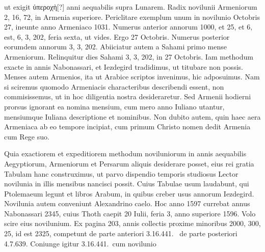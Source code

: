 ut exigit \textgreek{ὐπεροχὴ}[?] anni aequabilis supra Lunarem.
Radix novilunii Armeniorum
2, 16, 72, in Armenia superiore.
Periclitare exemplum %
 unum
in novilunio Octobris 27, ineunte anno Armeniaco 1031.
Numerus
anterior annorum 1000, et 25, et 6, est, 6, 3, 202, feria sexta, ut vides.
Ergo 27 Octobris.
Numerus posterior eorumdem annorum 3, 3, 202.
Abiiciatur autem a Sahami primo mense Armeniorum.
Relinquitur
dies Sahami 3, 3, 202, in 27 Octobris.
Iam methodum exacte
in annis Nabonassari, et
Iezdegird tradidimus, ut
titubare non possis.
Menses
autem Armenios, ita
ut Arabice scriptos invenimus, hic adposuimus.
Nam si sciremus
quomodo Armeniacis
characteribus describendi
essent, non commisissemus,
ut in hoc diligentia
nostra desideraretur.
Sed Armenii hodierni
prorsus ignorant ea nomina
mensium, cum mero %
anno Iuliano utantur,
mensiumque Iuliana descriptione
et nominibus.
Non dubito autem, quin
haec aera Armeniaca ab
eo tempore incipiat, cum
primum Christo nomen
dedit Armenia cum Rege suo.
%
%
\begin{table}[tbp]
  
\end{table}
\begin{table}[tbp]
  
\end{table}
%
Quia exactiorem et expeditiorem methodum noviluniorum in
annis aequabilis Aegyptiorum, Armeniorum et Persarum aliquis
desiderare posset, eius rei gratia Tabulam
hanc construximus, ut parvo
dispendio temporis studiosus Lector
novilunia in illis mensibus nancisci
possit.
%
Cuius Tabulae usum laudabunt,
qui Ptolemaeum legunt et libros
Arabum, in quibus creber usus
annorum Iezdegird.
Novilunia autem
conveniunt Alexandrino caelo.
Hoc anno 1597 currebat annus Nabonassari
2345, cuius Thoth caepit
20 Iulii, feria 3, anno superiore 1596.
Volo scire eius novilunium.
Ex pagina
203, annis collectis proxime minoribus
2000, 300, 25, id est 2325,
competunt de parte anteriori 3.16.441.\ %
de parte posteriori 4.7.639. %
Coniunge igitur 3.16.441.\ cum novilunio
